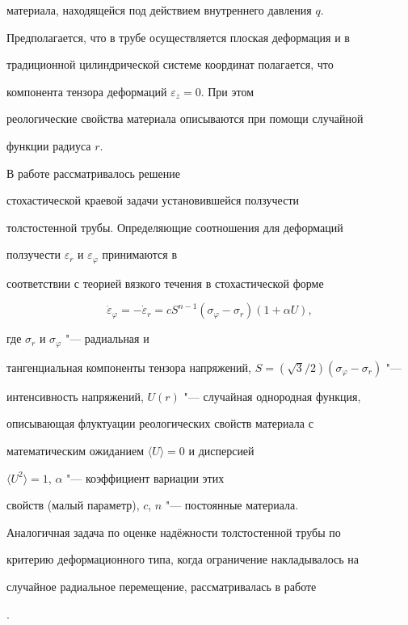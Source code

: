 материала, находящейся под действием внутреннего давления $q$.

Предполагается, что в трубе осуществляется плоская деформация и в

традиционной цилиндрической системе координат полагается, что

компонента тензора деформаций $\varepsilon_z=0$. При этом

реологические свойства материала описываются при помощи случайной

функции радиуса $r$.



В работе \cite{popovkoval:bib:RadchPopov} рассматривалось решение

стохастической краевой задачи установившейся ползучести

толстостенной трубы. Определяющие соотношения для деформаций

ползучести $\varepsilon_r$ и $\varepsilon_\varphi$ принимаются в

соответствии с теорией вязкого течения в стохастической форме

\[

\dot {\varepsilon }_\varphi = - \dot {\varepsilon }_r = cS^{n -

1}(\sigma _\varphi - \sigma _r )(1 + \alpha U),

\]

где $\sigma _r$ и $\sigma _\varphi$ "--- радиальная и

тангенциальная компоненты тензора напряжений,  $S =

({\sqrt{3}}/{2})(\sigma _\varphi - \sigma _r )$ "--- 

интенсивность напряжений, $U(r)$ "---  случайная однородная функция,

описывающая флуктуации реологических свойств материала с

математическим ожиданием $\langle U\rangle=0$ и дисперсией

$\langle U^2\rangle=1$, $\alpha$ "---  коэффициент вариации этих

свойств (малый параметр), $c$, $n$ "---  постоянные материала.



Аналогичная задача по оценке надёжности толстостенной трубы по

критерию деформационного типа, когда ограничение накладывалось на

случайное радиальное перемещение, рассматривалась в работе

\cite{popovkoval:bib:PopovKoval}.



